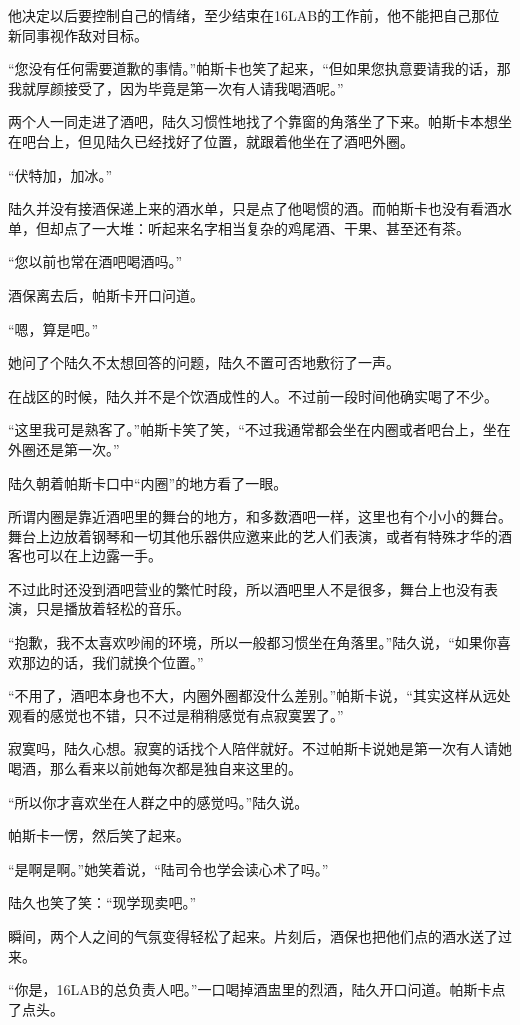 他决定以后要控制自己的情绪，至少结束在16LAB的工作前，他不能把自己那位新同事视作敌对目标。

“您没有任何需要道歉的事情。”帕斯卡也笑了起来，“但如果您执意要请我的话，那我就厚颜接受了，因为毕竟是第一次有人请我喝酒呢。”

两个人一同走进了酒吧，陆久习惯性地找了个靠窗的角落坐了下来。帕斯卡本想坐在吧台上，但见陆久已经找好了位置，就跟着他坐在了酒吧外圈。

“伏特加，加冰。”

陆久并没有接酒保递上来的酒水单，只是点了他喝惯的酒。而帕斯卡也没有看酒水单，但却点了一大堆：听起来名字相当复杂的鸡尾酒、干果、甚至还有茶。

“您以前也常在酒吧喝酒吗。”

酒保离去后，帕斯卡开口问道。

“嗯，算是吧。”

她问了个陆久不太想回答的问题，陆久不置可否地敷衍了一声。

在战区的时候，陆久并不是个饮酒成性的人。不过前一段时间他确实喝了不少。

“这里我可是熟客了。”帕斯卡笑了笑，“不过我通常都会坐在内圈或者吧台上，坐在外圈还是第一次。”

陆久朝着帕斯卡口中“内圈”的地方看了一眼。

所谓内圈是靠近酒吧里的舞台的地方，和多数酒吧一样，这里也有个小小的舞台。舞台上边放着钢琴和一切其他乐器供应邀来此的艺人们表演，或者有特殊才华的酒客也可以在上边露一手。

不过此时还没到酒吧营业的繁忙时段，所以酒吧里人不是很多，舞台上也没有表演，只是播放着轻松的音乐。

“抱歉，我不太喜欢吵闹的环境，所以一般都习惯坐在角落里。”陆久说，“如果你喜欢那边的话，我们就换个位置。”

“不用了，酒吧本身也不大，内圈外圈都没什么差别。”帕斯卡说，“其实这样从远处观看的感觉也不错，只不过是稍稍感觉有点寂寞罢了。”

寂寞吗，陆久心想。寂寞的话找个人陪伴就好。不过帕斯卡说她是第一次有人请她喝酒，那么看来以前她每次都是独自来这里的。

“所以你才喜欢坐在人群之中的感觉吗。”陆久说。

帕斯卡一愣，然后笑了起来。

“是啊是啊。”她笑着说，“陆司令也学会读心术了吗。”

陆久也笑了笑：“现学现卖吧。”

瞬间，两个人之间的气氛变得轻松了起来。片刻后，酒保也把他们点的酒水送了过来。

“你是，16LAB的总负责人吧。”一口喝掉酒盅里的烈酒，陆久开口问道。帕斯卡点了点头。

